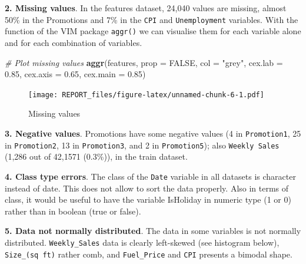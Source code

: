 \documentclass[11pt,]{article}
\newenvironment{Shaded}{\begin{snugshade}}{\end{snugshade}}
\newcommand{\KeywordTok}[1]{\textcolor[rgb]{0.13,0.29,0.53}{\textbf{{#1}}}}
\newcommand{\DataTypeTok}[1]{\textcolor[rgb]{0.13,0.29,0.53}{{#1}}}
\newcommand{\FloatTok}[1]{\textcolor[rgb]{0.00,0.00,0.81}{{#1}}}
\newcommand{\StringTok}[1]{\textcolor[rgb]{0.31,0.60,0.02}{{#1}}}
\newcommand{\CommentTok}[1]{\textcolor[rgb]{0.56,0.35,0.01}{\textit{{#1}}}}
\newcommand{\OtherTok}[1]{\textcolor[rgb]{0.56,0.35,0.01}{{#1}}}
\newcommand{\NormalTok}[1]{{#1}}
\begin{document}
\textbf{2. Missing values}. In the features dataset, 24,040 values are
missing, almost 50\% in the Promotions and 7\% in the \texttt{CPI} and
\texttt{Unemployment} variables. With the function of the VIM package
\texttt{aggr()} we can visualise them for each variable alone and for
each combination of variables.

\begin{Shaded}
\begin{Highlighting}[]
\CommentTok{# Plot missing values}
\KeywordTok{aggr}\NormalTok{(features, }\DataTypeTok{prop =} \OtherTok{FALSE}\NormalTok{, }\DataTypeTok{col =} \StringTok{"grey"}\NormalTok{, }\DataTypeTok{cex.lab =} \FloatTok{0.85}\NormalTok{, }\DataTypeTok{cex.axis =} \FloatTok{0.65}\NormalTok{, }
    \DataTypeTok{cex.main =} \FloatTok{0.85}\NormalTok{)}
\end{Highlighting}
\end{Shaded}

\begin{figure}[htbp]
\centering
\texttt{[image: REPORT\_files/figure-latex/unnamed-chunk-6-1.pdf]}
\caption{Missing values}
\end{figure}

\textbf{3. Negative values}. Promotions have some negative values (4 in
\texttt{Promotion1}, 25 in \texttt{Promotion2}, 13 in
\texttt{Promotion3}, and 2 in \texttt{Promotion5}); also
\texttt{Weekly\ Sales} (1,286 out of 42,1571 (0.3\%)), in the train
dataset.

\textbf{4. Class type errors}. The class of the \texttt{Date} variable
in all datasets is character instead of date. This does not allow to
sort the data properly. Also in terms of class, it would be useful to
have the variable IsHoliday in numeric type (1 or 0) rather than in
boolean (true or false).

\textbf{5. Data not normally distributed}. The data in some variables is
not normally distributed. \texttt{Weekly\_Sales} data is clearly
left-skewed (see histogram below), \texttt{Size\_(sq\ ft)} rather comb,
and \texttt{Fuel\_Price} and \texttt{CPI} presents a bimodal shape.

\begin{Shaded}
\end{Shaded}
\end{document}
